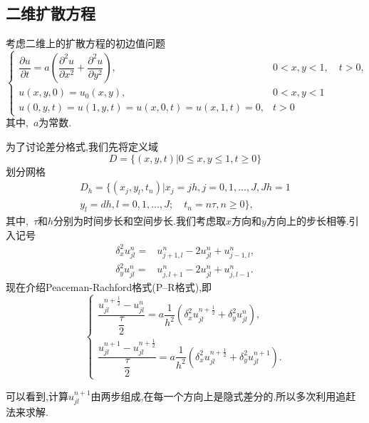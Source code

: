 \subsection{二维扩散方程}
考虑二维上的扩散方程的初边值问题
\begin{equation}\label{eq:04_ew_q}
\begin{cases}
\dfrac{\partial u}{\partial t}=a\left(\dfrac{\partial^2 u}{\partial x^2}+\dfrac{\partial^2 u}{\partial y^2}\right),& 0<x,y<1,\quad t>0, \\
u(x,y,0)=u_0(x,y),& 0<x,y<1 \\
u(0,y,t)=u(1,y,t)=u(x,0,t)=u(x,1,t)=0,& t>0
\end{cases}
\end{equation}
其中,~$a$为常数.\par
为了讨论差分格式,我们先将定义域
\begin{equation*}
D=\{(x,y,t)|0\leq x,y\leq 1,t\geq 0\}
\end{equation*}
划分网格
\begin{equation}
\begin{split}
D_h=\{(x_j,y_l,t_n)|x_j=jh,j=0,1,\ldots,J,Jh=1 \\
y_l=dh,l=0,1,\ldots,J;\quad t_n=n\tau,n\geq0\},
\nonumber
\end{split}
\end{equation}
其中,~$\tau$和$h$分别为时间步长和空间步长.我们考虑取$x$方向和$y$方向上的步长相等.引入记号
\begin{equation*}
\begin{split}
\delta_x^2 u_{jl}^n =& u_{j+1,l}^n-2u_{jl}^n+u_{j-1,l}^n, \\
\delta_y^2 u_{jl}^n =& u_{j,l+1}^n-2u_{jl}^n+u_{j,l-1}^n.
\end{split}
\end{equation*}
现在介绍Peaceman-Rachford格式(P--R格式),即
\begin{equation}\label{eq:04_ew_pr}
\begin{cases}
\dfrac{u_{jl}^{n+\frac{1}{2}}-u_{jl}^n}{\dfrac{\tau}{2}}=a\dfrac{1}{h^2}(\delta_x^2u_{jl}^{n+\frac{1}{2}}+
\delta_y^2 u_{jl}^n),\\
\dfrac{u_{jl}^{n+1}-u_{jl}^{n+\frac{1}{2}}}{\dfrac{\tau}{2}}=a\dfrac{1}{h^2}(\delta_x^2u_{jl}^{n+\frac{1}{2}}+
\delta_y^2u_{jl}^{n+1}). 
\end{cases}
\end{equation}\par
可以看到,计算$u_{jl}^{n+1}$由两步组成,在每一个方向上是隐式差分的.所以多次利用追赶法来求解.\par
